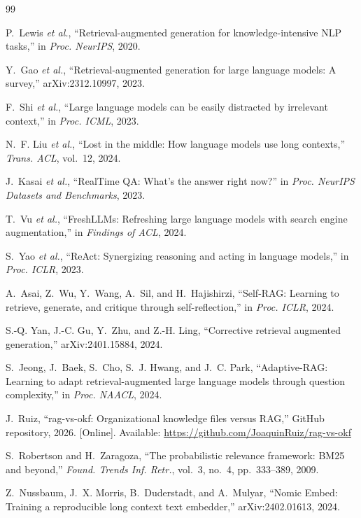 \documentclass[conference]{IEEEtran}
\begin{document}
\begin{thebibliography}{99}

P.~Lewis \emph{et al.}, ``Retrieval-augmented generation for knowledge-intensive NLP tasks,'' in \emph{Proc. NeurIPS}, 2020.

Y.~Gao \emph{et al.}, ``Retrieval-augmented generation for large language models: A survey,'' arXiv:2312.10997, 2023.

F.~Shi \emph{et al.}, ``Large language models can be easily distracted by irrelevant context,'' in \emph{Proc. ICML}, 2023.

N.~F. Liu \emph{et al.}, ``Lost in the middle: How language models use long contexts,'' \emph{Trans. ACL}, vol.~12, 2024.

J.~Kasai \emph{et al.}, ``RealTime QA: What's the answer right now?'' in \emph{Proc. NeurIPS Datasets and Benchmarks}, 2023.

T.~Vu \emph{et al.}, ``FreshLLMs: Refreshing large language models with search engine augmentation,'' in \emph{Findings of ACL}, 2024.

S.~Yao \emph{et al.}, ``ReAct: Synergizing reasoning and acting in language models,'' in \emph{Proc. ICLR}, 2023.

A.~Asai, Z.~Wu, Y.~Wang, A.~Sil, and H.~Hajishirzi, ``Self-RAG: Learning to retrieve, generate, and critique through self-reflection,'' in \emph{Proc. ICLR}, 2024.

S.-Q. Yan, J.-C. Gu, Y.~Zhu, and Z.-H. Ling, ``Corrective retrieval augmented generation,'' arXiv:2401.15884, 2024.

S.~Jeong, J.~Baek, S.~Cho, S.~J. Hwang, and J.~C. Park, ``Adaptive-RAG: Learning to adapt retrieval-augmented large language models through question complexity,'' in \emph{Proc. NAACL}, 2024.

J.~Ruiz, ``rag-vs-okf: Organizational knowledge files versus RAG,'' GitHub repository, 2026. [Online]. Available: \url{https://github.com/JoaquinRuiz/rag-vs-okf}

S.~Robertson and H.~Zaragoza, ``The probabilistic relevance framework: BM25 and beyond,'' \emph{Found. Trends Inf. Retr.}, vol.~3, no.~4, pp.~333--389, 2009.

Z.~Nussbaum, J.~X. Morris, B.~Duderstadt, and A.~Mulyar, ``Nomic Embed: Training a reproducible long context text embedder,'' arXiv:2402.01613, 2024.


\end{thebibliography}
\end{document}
